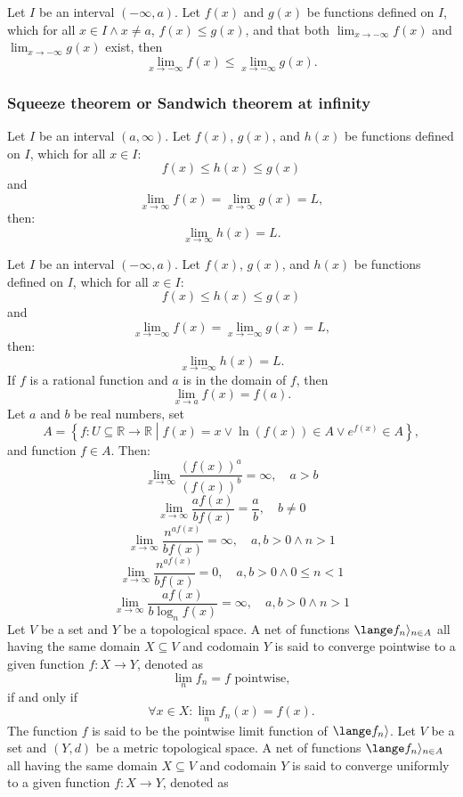 \documentclass[a4paper,12pt]{report}
\begin{document}
Let \(I\) be an interval $(-\infty,a)$. Let $f(x)$ and $g(x)$ be functions defined on \(I\), which for all $x\in I\land x\neq a$, $f(x)\leq g(x)$, and that both $\lim_{x\to-\infty}f(x)$ and $\lim_{x\to-\infty}g(x)$ exist, then
\[\lim_{x\to-\infty}f(x)\leq\lim_{x\to-\infty}g(x).\]
\subsubsection{Squeeze theorem or Sandwich theorem at infinity}
Let \(I\) be an interval $(a,\infty)$. Let $f(x)$, $g(x)$, and $h(x)$ be functions defined on \(I\), which for all $x\in I$:
\[f(x)\leq h(x)\leq g(x)\]
and
\[\lim_{x\to\infty}f(x)=\lim_{x\to\infty}g(x)=L,\]
then: 
\[\lim_{x\to\infty}h(x)=L.\]

Let \(I\) be an interval $(-\infty,a)$. Let $f(x)$, $g(x)$, and $h(x)$ be functions defined on \(I\), which for all $x\in I$:
\[f(x)\leq h(x)\leq g(x)\]
and
\[\lim_{x\to-\infty}f(x)=\lim_{x\to-\infty}g(x)=L,\]
then: 
\[\lim_{x\to-\infty}h(x)=L.\]
If $f$ is a rational function and $a$ is in the domain of $f$, then
\[\lim_{x\to a}f(x)=f(a).\]
Let \( a \) and \( b \) be real numbers, set
\[A=\left\{f\colon U\subseteq\mathbb{R}\to\mathbb{R} \middle | f(x) = x \lor \ln(f(x)) \in A \lor e^{f\left(x\right)}  \in A \right\},\]
and function $f\in A$. Then:
\[\lim_{x \to \infty} \frac{\left(f\left(x\right)\right)^a}{\left(f\left(x\right)\right)^b} = \infty, \quad a > b \]
\[ \lim_{x \to \infty} \frac{af\left(x\right)}{bf\left(x\right)} = \frac{a}{b}, \quad b \neq 0 \]
\[ \lim_{x \to \infty}\frac{n^{af\left(x\right)}}{bf\left(x\right)} = \infty, \quad a,b > 0 \land  n > 1 \]
\[ \lim_{x \to \infty}\frac{n^{af\left(x\right)}}{bf\left(x\right)} = 0, \quad a,b > 0 \land  0\leq n<1 \]
\[ \lim_{x \to \infty}\frac{af\left(x\right)}{b\log_n f\left(x\right)} = \infty, \quad a,b > 0 \land  n > 1 \]
Let $V$ be a set and $Y$ be a topological space. A net of functions $\lange f_n\rangle_{n\in A}$ all having the same domain $X\subseteq V$ and codomain $Y$ is said to converge pointwise to a given function $f\colon X\to Y$, denoted as 
\[\lim_nf_n=f\text{\ pointwise},\]
if and only if
\[\forall x\in X\colon\lim_nf_n(x)=f(x).\]
The function $f$ is said to be the pointwise limit function of $\lange f_n\rangle$.
Let $V$ be a set and $(Y,d)$ be a metric topological space. A net of functions $\lange f_n\rangle_{n\in A}$ all having the same domain $X\subseteq V$ and codomain $Y$ is said to converge uniformly to a given function $f\colon X\to Y$, denoted as 
\end{document}
